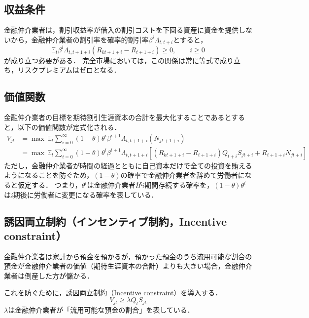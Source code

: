 \documentclass[dvipdfmx]{jlreq}
\begin{document}
\subsection*{収益条件}
金融仲介業者は，割引収益率が借入の割引コストを下回る資産に資金を提供しないから，金融仲介業者の割引率を確率的割引率$\beta^i \Lambda_{t,t+i}$とすると，
\begin{equation}
  \mathbb{E}_t \beta^i \Lambda_{t,t+1+i} (R_{kt+1+i} - R_{t+1+i}) \geq 0, \qquad i \geq 0
\end{equation}
が成り立つ必要がある．
完全市場においては，この関係は常に等式で成り立ち，リスクプレミアムはゼロとなる．

\subsection*{価値関数} \label{kati_kansuu}
金融仲介業者の目標を期待割引生涯資本の合計を最大化することであるとすると，以下の価値関数が定式化される．
\begin{align}
  V_{jt} &= \max \, \mathbb{E}_t \sum_{i=0}^{\infty} (1-\theta) \theta^i \beta^{i+1} \Lambda_{t,t+1+i} (N_{jt+1+i}) \\
  &= \max \, \mathbb{E}_t \sum_{i=0}^{\infty} (1-\theta) \theta^i \beta^{i+1} \Lambda_{t,t+1+i} [(R_{kt+1+i} - R_{t+1+i}) Q_{t+i} S_{jt+i} + R_{t+1+i} N_{jt+i}]
\end{align}
ただし，金融仲介業者が時間の経過とともに自己資本だけで全ての投資を賄えるようになることを防ぐため，$(1 - \theta)$の確率で金融仲介業者を辞めて労働者になると仮定する．
つまり，$\theta^i$は金融仲介業者が$i$期間存続する確率を，$(1-\theta) \theta^i$は$i$期後に労働者に変更になる確率を表している．

\subsection*{誘因両立制約（インセンティブ制約，Incentive constraint）}
金融仲介業者は家計から預金を預かるが，預かった預金のうち流用可能な割合の預金が金融仲介業者の価値（期待生涯資本の合計）よりも大きい場合，金融仲介業者は倒産した方が儲かる．

これを防ぐために，誘因両立制約（Incentive constraint）を導入する．
\begin{equation}
  V_{jt} \geq \lambda Q_t S_{jt} \label{eq:9}
\end{equation}
$\lambda$は金融仲介業者が「流用可能な預金の割合」を表している．
\end{document}
